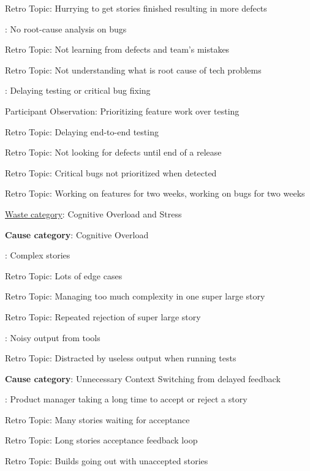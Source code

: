 \quad \quad \quad Retro Topic: Hurrying to get stories finished resulting in more defects

\quad {}: No root-cause analysis on bugs

\quad \quad \quad Retro Topic: Not learning from defects and team's mistakes

\quad \quad \quad Retro Topic: Not understanding what is root cause of tech problems

\quad {}: Delaying testing or critical bug fixing

\quad \quad \quad Participant Observation: Prioritizing feature work over testing

\quad \quad \quad Retro Topic: Delaying end-to-end testing

\quad \quad \quad Retro Topic: Not looking for defects until end of a release

\quad \quad \quad Retro Topic: Critical bugs not prioritized when detected

\quad \quad \quad Retro Topic: Working on features for two weeks, working on bugs for two weeks





\underline{Waste category}: Cognitive Overload and Stress

\quad \textbf{Cause category}: Cognitive Overload

\quad {}: Complex stories

\quad \quad \quad Retro Topic: Lots of edge cases

\quad \quad \quad Retro Topic: Managing too much complexity in one super large story

\quad \quad \quad Retro Topic: Repeated rejection of super large story

\quad {}: Noisy output from tools

\quad \quad \quad \quad Retro Topic: Distracted by useless output when running tests

\quad \quad \textbf{Cause category}: Unnecessary Context Switching from delayed feedback

\quad \quad {}: Product manager taking a long time to accept or reject a story

\quad \quad \quad \quad Retro Topic: Many stories waiting for acceptance

\quad \quad \quad \quad Retro Topic: Long stories acceptance feedback loop

\quad \quad \quad \quad Retro Topic: Builds going out with unaccepted stories


